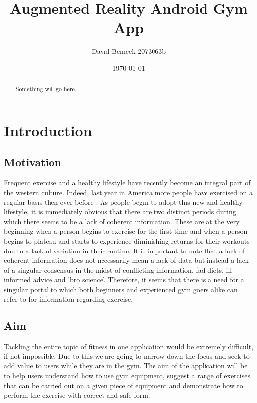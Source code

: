 \documentclass{l4proj}
\begin{document}
\title{Augmented Reality Android Gym App}
\author{David Benicek 2073063b}
\date{\today}
\maketitle

\begin{abstract}
Something will go here.
\end{abstract}

\educationalconsent
%
%
\tableofcontents

\chapter{Introduction}
\section{Motivation}
Frequent exercise and a healthy lifestyle have recently become an integral part of the western culture. Indeed, last year in America more people have exercised on a regular basis then ever before \cite{USexercise}. As people begin to adopt this new and healthy lifestyle, it is immediately obvious that there are two distinct periods during which there seems to be a lack of coherent information. These are at the very beginning when a person begins to exercise for the first time and when a person begins to plateau and starts to experience diminishing returns for their workouts due to a lack of variation in their routine. It is important to note that a lack of coherent information does not necessarily mean a lack of data but instead a lack of a singular consensus in the midst of conflicting information, fad diets, ill-informed advice and 'bro science'. Therefore, it seems that there is a need for a singular portal to which both beginners and experienced gym goers alike can refer to for information regarding exercise.  

\section{Aim} \label{sec:aim}
Tackling the entire topic of fitness in one application would be extremely difficult, if not impossible. Due to this we are going to narrow down the focus and seek to add value to users while they are in the gym. The aim of the application will be to help users understand how to use gym equipment, suggest a range of exercises that can be carried out on a given piece of equipment and demonstrate how to perform the exercise with correct and safe form. 
\end{document}

